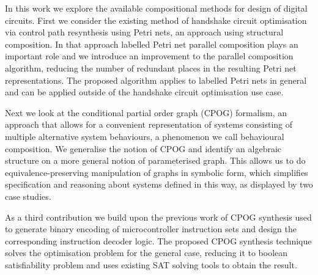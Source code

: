 \abstract

In this work we explore the available compositional methods for design of digital circuits.
First we consider the existing method of handshake circuit optimisation via control path 
resynthesis using Petri nets, an approach using structural composition. 
In that approach labelled Petri net parallel composition plays an important role
and we introduce an improvement to the parallel composition algorithm, reducing the number of redundant places in 
the resulting Petri net representations. The proposed algorithm applies to labelled Petri nets in general
and can be applied outside of the handshake circuit optimisation use case.

Next we look at the conditional partial order graph (CPOG) formalism, an approach that allows for a convenient representation of systems
consisting of multiple alternative system behaviours, a phenomenon we call behavioural composition.
We generalise the notion of CPOG and identify an algebraic structure on a more general notion of parameterised graph.
This allows us to do equivalence-preserving manipulation of graphs in symbolic form, which simplifies
specification and reasoning about systems defined in this way, as displayed by two case studies.

As a third contribution we build upon the previous work of CPOG synthesis used 
to generate binary encoding of microcontroller instruction sets and design the corresponding instruction decoder logic. 
The proposed CPOG synthesis technique solves the optimisation problem for the
general case, reducing it to boolean satisfiability problem and uses existing 
SAT solving tools to obtain the result.












